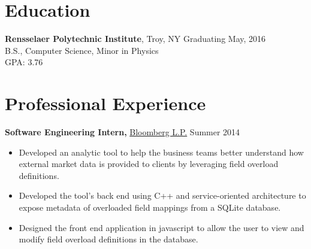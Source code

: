 \documentclass[margin]{res}
\begin{document}
 
\begin{minipage}{\textwidth}

 
\address{{\bf Present Address} \\ 2166 14th St \\ 2nd Floor \\ Troy, NY 12180 }
\address{{\bf Permanent Address} \\ 4 Oak Street \\ Cumberland, ME 04021 }
\begin{resume} 
 
\section{Education} 
{\bf Rensselaer Polytechnic Institute}, Troy, NY \hfill Graduating May, 2016 \\
B.S., Computer Science, Minor in Physics \\
GPA: 3.76
 

\section{Professional Experience}
{\bf Software Engineering Intern,} \uline{Bloomberg L.P.} \hfill Summer 2014
 \begin{itemize} \itemsep -2pt
 \item Developed an analytic tool to help the business teams better understand how external market data is provided to clients by leveraging field overload definitions.
 \item Developed the tool's back end using C++ and service-oriented architecture to expose metadata of overloaded field mappings from a SQLite database.
 \item Designed the front end application in javascript to allow the user to view and modify field overload definitions in the database.
 \end{itemize}




\end{resume}
\end{minipage}
\end{document}
